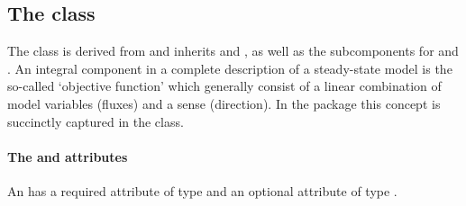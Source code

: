 %
%
%


\subsection{The \FBC {} class}
\label{objective-class}
\label{listoffluxobjectives-class}

The \FBC \Objective class is derived from \SBML \SBase and inherits
 and , as well as the subcomponents for
\Annotation and \Notes. An integral component in a complete description
of a steady-state model is the so-called `objective function' which generally
consist of a linear combination of model variables (fluxes) and a sense
(direction). In the \FBC package this concept is succinctly captured in the
\Objective class.

\paragraph{The  and  attributes}
An \Objective has a required attribute  of type
 and an optional attribute  of type .

